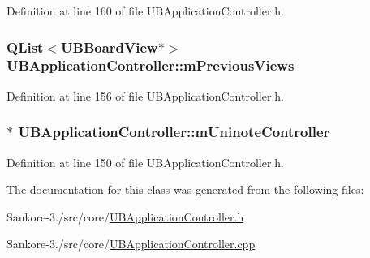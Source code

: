 Definition at line 160 of file U\-B\-Application\-Controller.\-h.

\hypertarget{class_u_b_application_controller_acd65c7cfb4d0426d7c539b1e9549fa0b}{
\subsubsection[{m\-Previous\-Views}]{\setlength{\rightskip}{0pt plus 5cm}Q\-List$<${\bf U\-B\-Board\-View}$\ast$$>$ U\-B\-Application\-Controller\-::m\-Previous\-Views\hspace{0.3cm}{\ttfamily [protected]}}}\label{da/d14/class_u_b_application_controller_acd65c7cfb4d0426d7c539b1e9549fa0b}


Definition at line 156 of file U\-B\-Application\-Controller.\-h.

\hypertarget{class_u_b_application_controller_a5c3c538c6d76d4c6ca4b704467be70e6}{
\subsubsection[{m\-Uninote\-Controller}]{$\ast$ U\-B\-Application\-Controller\-::m\-Uninote\-Controller\hspace{0.3cm}{\ttfamily [protected]}}}\label{da/d14/class_u_b_application_controller_a5c3c538c6d76d4c6ca4b704467be70e6}


Definition at line 150 of file U\-B\-Application\-Controller.\-h.



The documentation for this class was generated from the following files\-:\begin{DoxyCompactItemize}
\item 
Sankore-\/3./src/core/\hyperlink{_u_b_application_controller_8h}{U\-B\-Application\-Controller.\-h}\item 
Sankore-\/3./src/core/\hyperlink{_u_b_application_controller_8cpp}{U\-B\-Application\-Controller.\-cpp}\end{DoxyCompactItemize}
